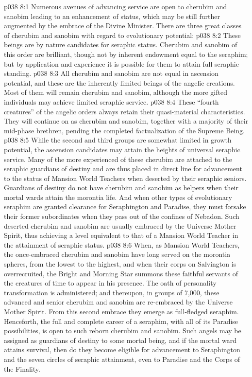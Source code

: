 \vs p038 8:1 Numerous avenues of advancing service are open to cherubim and sanobim leading to an enhancement of status, which may be still further augmented by the embrace of the Divine Minister. There are three great classes of cherubim and sanobim with regard to evolutionary potential:
\vs p038 8:2 \bibnobreakspace {} These beings are by nature candidates for seraphic status. Cherubim and sanobim of this order are brilliant, though not by inherent endowment equal to the seraphim; but by application and experience it is possible for them to attain full seraphic standing.
\vs p038 8:3 \bibnobreakspace {} All cherubim and sanobim are not equal in ascension potential, and these are the inherently limited beings of the angelic creations. Most of them will remain cherubim and sanobim, although the more gifted individuals may achieve limited seraphic service.
\vs p038 8:4 \bibnobreakspace {} These “fourth creatures” of the angelic orders always retain their quasi\hyp{}material characteristics. They will continue on as cherubim and sanobim, together with a majority of their mid\hyp{}phase brethren, pending the completed factualization of the Supreme Being.
\vs p038 8:5 \pc While the second and third groups are somewhat limited in growth potential, the ascension candidates may attain the heights of universal seraphic service. Many of the more experienced of these cherubim are attached to the seraphic guardians of destiny and are thus placed in direct line for advancement to the status of Mansion World Teachers when deserted by their seraphic seniors. Guardians of destiny do not have cherubim and sanobim as helpers when their mortal wards attain the morontia life. And when other types of evolutionary seraphim are granted clearance for Seraphington and Paradise, they must forsake their former subordinates when they pass out of the confines of Nebadon. Such deserted cherubim and sanobim are usually embraced by the Universe Mother Spirit, thus achieving a level equivalent to that of a Mansion World Teacher in the attainment of seraphic status.
\vs p038 8:6 When, as Mansion World Teachers, the once\hyp{}embraced cherubim and sanobim have long served on the morontia spheres, from the lowest to the highest, and when their corps on Salvington is overrecruited, the Bright and Morning Star summons these faithful servants of the creatures of time to appear in his presence. The oath of personality transformation is administered; and thereupon, in groups of 7,000, these advanced and senior cherubim and sanobim are re\hyp{}embraced by the Universe Mother Spirit. From this second embrace they emerge as full\hyp{}fledged seraphim. Henceforth, the full and complete career of a seraphim, with all of its Paradise possibilities, is open to such reborn cherubim and sanobim. Such angels may be assigned as guardians of destiny to some mortal being, and if the mortal ward attains survival, then do they become eligible for advancement to Seraphington and the seven circles of seraphic attainment, even to Paradise and the Corps of the Finality.
